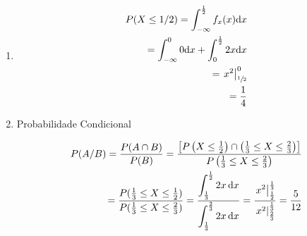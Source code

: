 \begin{example}
\begin{enumerate}[label=(\alph*)]
         \item 
           \begin{align*}
             P(X \leq 1/2) = \int_{-\infty}^{\frac{1}{2}} f_x (x) \mathrm{d}x\\
             = \int_{-\infty}^0 0 \mathrm{d}x + \int_{0}^{\frac{1}{2}} 2x \mathrm{d}x \\
             = \left.x^2\right\rvert_{{\sfrac{1}{2}}}^{0}\\
             =\frac{1}{4} 
           \end{align*}
       \item Probabilidade Condicional
             \begin{figure}[H]
               \centering
               
               \label{fig:26}
             \end{figure}
             \begin{align*}
               P(A/B)= \frac{P(A\cap B)}{P(B)} 
               =\frac{ \left[   P\left( X \leq \frac{1}{2} \right)\cap \left(\frac{1}{3} \leq X \leq \frac{2}{3}\right)\right]}{P \left( \frac{1}{3} \leq X \leq \frac{2}{3}\right)}\\
               = \frac{P( \frac{1}{3} \leq X \leq \frac{1}{2} )}{P( \frac{1}{3} \leq X \leq \frac{2}{3} )}
               = \frac{\displaystyle{\int_{\frac{1}{3}}^{\frac{1}{2}} 2x \,\mathrm{d}x}}{\displaystyle{\int_{\frac{1}{3}}^{\frac{2}{3}} 2x \,\mathrm{d}x}} 
               = \frac{\displaystyle{\left.x^2\right\rvert_{{\frac{1}{2}}}^{{\frac{1}{3}}}}}{ \left.x^2\right\rvert_{{\frac{2}{3}}}^{{\frac{1}{3}}}}
               = \frac{5}{12}
             \end{align*}
         \end{enumerate}
         \end{example}
